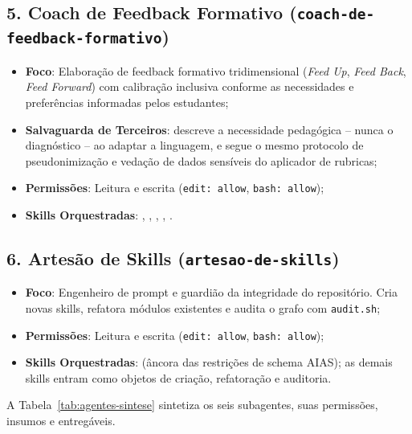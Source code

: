 \subsection{5. Coach de Feedback Formativo (\texttt{coach-de-feedback-formativo})}
\begin{itemize}
  \item \textbf{Foco}: Elabora{\c c}{\~a}o de feedback formativo tridimensional (\emph{Feed Up}, \emph{Feed Back}, \emph{Feed Forward}) com calibra{\c c}{\~a}o inclusiva conforme as necessidades e prefer{\^e}ncias informadas pelos estudantes;
  \item \textbf{Salvaguarda de Terceiros}: descreve a necessidade pedag{\'o}gica -- nunca o diagn{\'o}stico -- ao adaptar a linguagem, e segue o mesmo protocolo de pseudonimiza{\c c}{\~a}o e veda{\c c}{\~a}o de dados sens{\'i}veis do aplicador de rubricas;
  \item \textbf{Permiss{\~o}es}: Leitura e escrita (\texttt{edit: allow}, \texttt{bash: allow});
  \item \textbf{Skills Orquestradas}: , , , , .
\end{itemize}

\subsection{6. Artes{\~a}o de Skills (\texttt{artesao-de-skills})}
\begin{itemize}
  \item \textbf{Foco}: Engenheiro de prompt e guardi{\~a}o da integridade do reposit{\'o}rio. Cria novas skills, refatora m{\'o}dulos existentes e audita o grafo com \texttt{audit.sh};
  \item \textbf{Permiss{\~o}es}: Leitura e escrita (\texttt{edit: allow}, \texttt{bash: allow});
  \item \textbf{Skills Orquestradas}:  ({\^a}ncora das restri{\c c}{\~o}es de schema AIAS); as demais skills entram como objetos de cria{\c c}{\~a}o, refatora{\c c}{\~a}o e auditoria.
\end{itemize}

A Tabela~\ref{tab:agentes-sintese} sintetiza os seis subagentes, suas permiss{\~o}es, insumos e entreg{\'a}veis.

